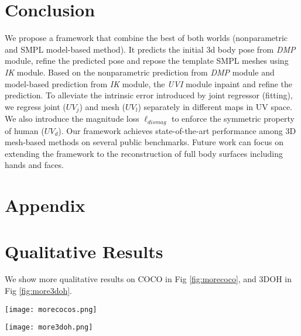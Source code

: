 \documentclass[10pt,twocolumn,letterpaper]{article}
\begin{document}
\section{Conclusion}
We propose a framework that combine the best of both worlds (nonparametric and SMPL model-based method). It predicts the initial 3d body pose from \textit{DMP} module, refine the predicted pose and repose the template SMPL meshes using \textit{IK} module. Based on the nonparametric prediction from \textit{DMP} module and model-based prediction from \textit{IK} module, the \textit{UVI} module inpaint and refine the prediction. To alleviate the intrinsic error introduced by joint regressor (fitting), we regress joint ($UV_j$) and mesh ($UV_l$) separately in different maps in UV space. We also introduce the magnitude loss $\ell_{dismag}$ to enforce the symmetric property of human ($UV_d$). Our framework achieves state-of-the-art performance among 3D
mesh-based methods on several public benchmarks. Future work can focus on extending the framework to the reconstruction of full body surfaces including hands and faces. 

{\small


}



\newpage

\appendix
\section*{Appendix}
\section{Qualitative Results}

We show more qualitative results on COCO \cite{lin2014microsoft} in Fig \ref{fig:morecoco}, and 3DOH \cite{3DOH} in Fig \ref{fig:more3doh}.


\begin{figure*}
\centering
\texttt{[image: morecocos.png]}
\caption{{More qualitative results on COCO dataset. (Best viewed in Color) }}
\label{fig:morecoco}
\end{figure*}


\begin{figure*}
\centering
\texttt{[image: more3doh.png]}
\caption{{More qualitative results on 3DOH dataset. (Best viewed in Color) }}
\label{fig:more3doh}
\end{figure*}
\end{document}
